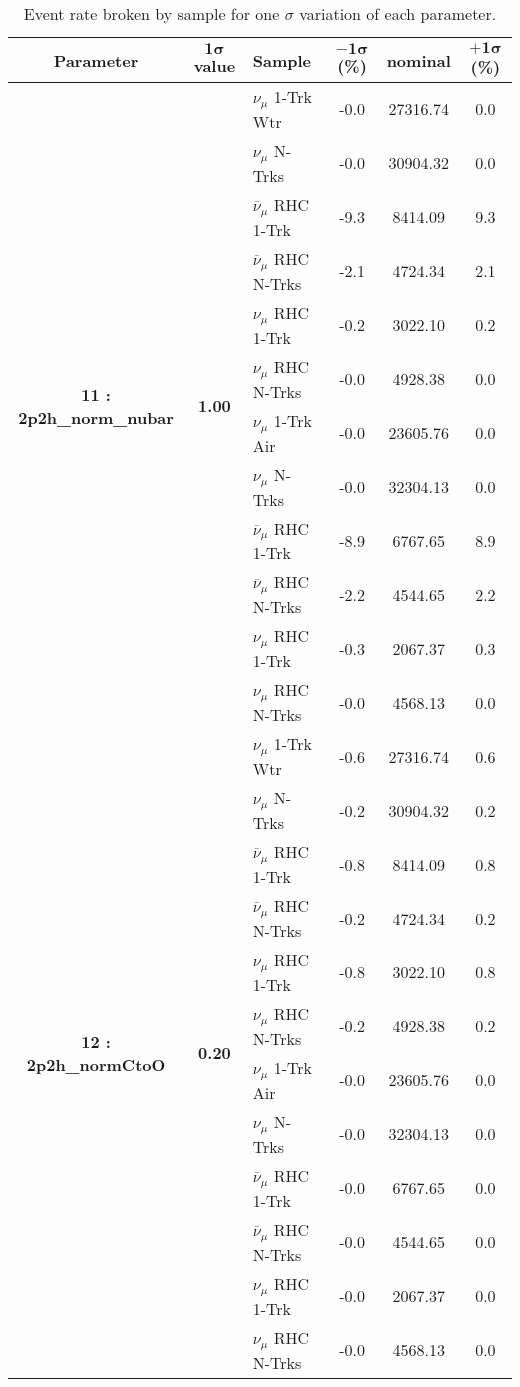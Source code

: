 \addtocounter{table}{-1}
\begin{table}[ht!]
\centering
\begin{tabular}{ c  c  l  c  c  c }
\midrule[1.3pt]
\textbf{Parameter} & \textbf{$\mathbf{1\sigma}$ value} & \textbf{Sample} & \textbf{$\mathbf{-1\sigma}$ (\%)}  &  \textbf{nominal}  &  \textbf{$\mathbf{+1\sigma}$ (\%)} \\
\midrule[1.3pt]
\multirow{12}{*}{\textbf{11 : 2p2h\_norm\_nubar}} & \multirow{12}{*}{\textbf{1.00}} & $\nu_\mu$ 1-Trk Wtr &   -0.0 &  27316.74 &   0.0 \\ 
 &  & $\nu_\mu$ N-Trks &   -0.0 &  30904.32 &   0.0 \\ 
 &  & $\overline{\nu}_\mu$ RHC 1-Trk &   -9.3 &  8414.09 &   9.3 \\ 
 &  & $\overline{\nu}_\mu$ RHC N-Trks &   -2.1 &  4724.34 &   2.1 \\ 
 &  & $\nu_\mu$ RHC 1-Trk &   -0.2 &  3022.10 &   0.2 \\ 
 &  & $\nu_\mu$ RHC N-Trks &   -0.0 &  4928.38 &   0.0 \\ 
 &  & $\nu_\mu$ 1-Trk Air &   -0.0 &  23605.76 &   0.0 \\ 
 &  & $\nu_\mu$ N-Trks &   -0.0 &  32304.13 &   0.0 \\ 
 &  & $\overline{\nu}_\mu$ RHC 1-Trk &   -8.9 &  6767.65 &   8.9 \\ 
 &  & $\overline{\nu}_\mu$ RHC N-Trks &   -2.2 &  4544.65 &   2.2 \\ 
 &  & $\nu_\mu$ RHC 1-Trk &   -0.3 &  2067.37 &   0.3 \\ 
 &  & $\nu_\mu$ RHC N-Trks &   -0.0 &  4568.13 &   0.0 \\ 
\midrule[1.3pt]
\multirow{12}{*}{\textbf{12 : 2p2h\_normCtoO}} & \multirow{12}{*}{\textbf{0.20}} & $\nu_\mu$ 1-Trk Wtr &   -0.6 &  27316.74 &   0.6 \\ 
 &  & $\nu_\mu$ N-Trks &   -0.2 &  30904.32 &   0.2 \\ 
 &  & $\overline{\nu}_\mu$ RHC 1-Trk &   -0.8 &  8414.09 &   0.8 \\ 
 &  & $\overline{\nu}_\mu$ RHC N-Trks &   -0.2 &  4724.34 &   0.2 \\ 
 &  & $\nu_\mu$ RHC 1-Trk &   -0.8 &  3022.10 &   0.8 \\ 
 &  & $\nu_\mu$ RHC N-Trks &   -0.2 &  4928.38 &   0.2 \\ 
 &  & $\nu_\mu$ 1-Trk Air &   -0.0 &  23605.76 &   0.0 \\ 
 &  & $\nu_\mu$ N-Trks &   -0.0 &  32304.13 &   0.0 \\ 
 &  & $\overline{\nu}_\mu$ RHC 1-Trk &   -0.0 &  6767.65 &   0.0 \\ 
 &  & $\overline{\nu}_\mu$ RHC N-Trks &   -0.0 &  4544.65 &   0.0 \\ 
 &  & $\nu_\mu$ RHC 1-Trk &   -0.0 &  2067.37 &   0.0 \\ 
 &  & $\nu_\mu$ RHC N-Trks &   -0.0 &  4568.13 &   0.0 \\ 
\midrule[1.3pt]
\end{tabular}
\centering
\caption{Event rate broken by sample for one $\sigma$ variation of each parameter.}
\end{table}
